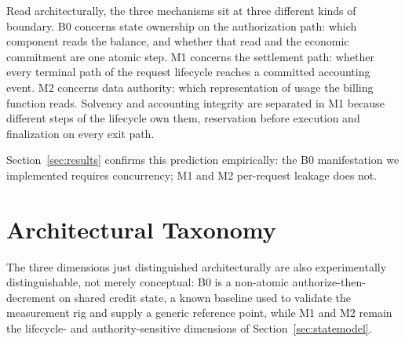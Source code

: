 \documentclass[final,5p,times,twocolumn,number]{elsarticle}
\begin{document}
\begin{table}[t]
\centering
\caption{Structural distinction between the three mechanisms: what is defective, what
triggers the baseline manifestation we implemented, and what closes it. ``Trigger'' is
implementation-specific; the general condition (final column of Table~\ref{tab:practical})
is what actually matters and is not concurrency-specific for any of the three.}
\label{tab:structural}
\end{table}

Read architecturally, the three mechanisms sit at three different kinds of boundary. B0
concerns state ownership on the authorization path: which component reads the balance,
and whether that read and the economic commitment are one atomic step. M1 concerns the
settlement path: whether every terminal path of the request lifecycle reaches a committed
accounting event. M2 concerns data authority: which representation of usage the billing
function reads. Solvency and accounting integrity are separated in M1 because different
steps of the lifecycle own them, reservation before execution and finalization on every
exit path.

Section~\ref{sec:results} confirms this prediction empirically: the B0 manifestation we
implemented requires concurrency; M1 and M2 per-request leakage does not.

\section{Architectural Taxonomy}
\label{sec:taxonomy}
The three dimensions just distinguished architecturally are also experimentally
distinguishable, not merely conceptual: B0 is a non-atomic authorize-then-decrement on
shared credit state, a known baseline used to validate the measurement rig and supply a
generic reference point, while M1 and M2 remain the lifecycle- and authority-sensitive
dimensions of Section~\ref{sec:statemodel}.
\end{document}
